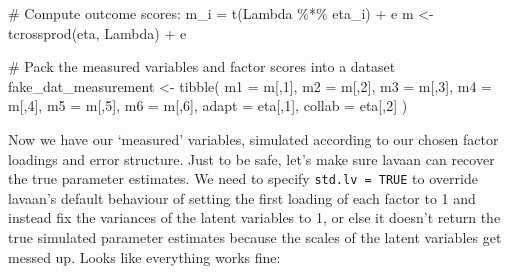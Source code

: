\documentclass[
  letterpaper,
  DIV=11,
  numbers=noendperiod]{scrreprt}
\newenvironment{Shaded}{\begin{snugshade}}{\end{snugshade}}
\newcommand{\AttributeTok}[1]{\textcolor[rgb]{0.40,0.45,0.13}{#1}}
\newcommand{\CommentTok}[1]{\textcolor[rgb]{0.37,0.37,0.37}{#1}}
\newcommand{\DecValTok}[1]{\textcolor[rgb]{0.68,0.00,0.00}{#1}}
\newcommand{\FunctionTok}[1]{\textcolor[rgb]{0.28,0.35,0.67}{#1}}
\newcommand{\NormalTok}[1]{\textcolor[rgb]{0.00,0.23,0.31}{#1}}
\newcommand{\OtherTok}[1]{\textcolor[rgb]{0.00,0.23,0.31}{#1}}
\newcommand{\SpecialCharTok}[1]{\textcolor[rgb]{0.37,0.37,0.37}{#1}}
\begin{document}
\begin{Shaded}
\begin{Highlighting}[]
\CommentTok{\# Compute outcome scores: m\_i = t(Lambda \%*\% eta\_i) + e}
\NormalTok{m }\OtherTok{\textless{}{-}} \FunctionTok{tcrossprod}\NormalTok{(eta, Lambda) }\SpecialCharTok{+}\NormalTok{ e}

\CommentTok{\# Pack the measured variables and factor scores into a dataset}
\NormalTok{fake\_dat\_measurement }\OtherTok{\textless{}{-}} \FunctionTok{tibble}\NormalTok{(}
  \AttributeTok{m1 =}\NormalTok{ m[,}\DecValTok{1}\NormalTok{],}
  \AttributeTok{m2 =}\NormalTok{ m[,}\DecValTok{2}\NormalTok{],}
  \AttributeTok{m3 =}\NormalTok{ m[,}\DecValTok{3}\NormalTok{],}
  \AttributeTok{m4 =}\NormalTok{ m[,}\DecValTok{4}\NormalTok{],}
  \AttributeTok{m5 =}\NormalTok{ m[,}\DecValTok{5}\NormalTok{],}
  \AttributeTok{m6 =}\NormalTok{ m[,}\DecValTok{6}\NormalTok{],}
  \AttributeTok{adapt =}\NormalTok{ eta[,}\DecValTok{1}\NormalTok{],}
  \AttributeTok{collab =}\NormalTok{ eta[,}\DecValTok{2}\NormalTok{]}
\NormalTok{)}
\end{Highlighting}
\end{Shaded}

Now we have our `measured' variables, simulated according to our chosen
factor loadings and error structure. Just to be safe, let's make sure
lavaan can recover the true parameter estimates. We need to specify
\texttt{std.lv\ =\ TRUE} to override lavaan's default behaviour of
setting the first loading of each factor to 1 and instead fix the
variances of the latent variables to 1, or else it doesn't return the
true simulated parameter estimates because the scales of the latent
variables get messed up. Looks like everything works fine:
\end{document}
